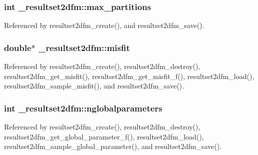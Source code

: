 \subsubsection[{\texorpdfstring{max\+\_\+partitions}{max_partitions}}]{\setlength{\rightskip}{0pt plus 5cm}int \+\_\+resultset2dfm\+::max\+\_\+partitions}\hypertarget{struct__resultset2dfm_aa3c389a7b9b79e145521bb169c156ef5}{}\label{struct__resultset2dfm_aa3c389a7b9b79e145521bb169c156ef5}


Referenced by resultset2dfm\+\_\+create(), and resultset2dfm\+\_\+save().

\subsubsection[{\texorpdfstring{misfit}{misfit}}]{\setlength{\rightskip}{0pt plus 5cm}double$\ast$ \+\_\+resultset2dfm\+::misfit}\hypertarget{struct__resultset2dfm_a63cad204f75525cdd68757c651f9b062}{}\label{struct__resultset2dfm_a63cad204f75525cdd68757c651f9b062}


Referenced by resultset2dfm\+\_\+create(), resultset2dfm\+\_\+destroy(), resultset2dfm\+\_\+get\+\_\+misfit(), resultset2dfm\+\_\+get\+\_\+misfit\+\_\+f(), resultset2dfm\+\_\+load(), resultset2dfm\+\_\+sample\+\_\+misfit(), and resultset2dfm\+\_\+save().

\subsubsection[{\texorpdfstring{nglobalparameters}{nglobalparameters}}]{\setlength{\rightskip}{0pt plus 5cm}int \+\_\+resultset2dfm\+::nglobalparameters}\hypertarget{struct__resultset2dfm_a097344b755a779249614ba5e821f0ae7}{}\label{struct__resultset2dfm_a097344b755a779249614ba5e821f0ae7}


Referenced by resultset2dfm\+\_\+create(), resultset2dfm\+\_\+destroy(), resultset2dfm\+\_\+get\+\_\+global\+\_\+parameter\+\_\+f(), resultset2dfm\+\_\+load(), resultset2dfm\+\_\+sample\+\_\+global\+\_\+parameter(), and resultset2dfm\+\_\+save().


